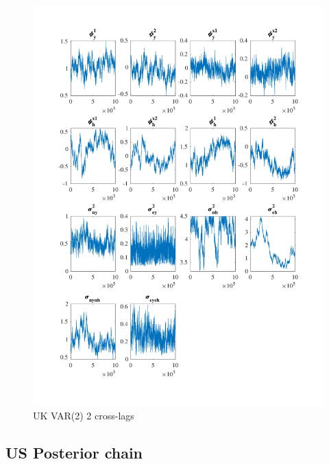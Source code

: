 \documentclass[
  12pt,
]{article}
\begin{document}
\begin{figure}

{\centering \includegraphics[width=0.85\linewidth]{../../Regression/Bayesian_UC_VAR2_nodrift_Crosscycle2lags/OutputData/posteriorchain_GB} 

}

\caption{UK VAR(2) 2 cross-lags}\label{fig:unnamed-chunk-17}
\end{figure}

\clearpage

\hypertarget{us-posterior-chain}{%
\subsection{US Posterior chain}\label{us-posterior-chain}}
\end{document}
